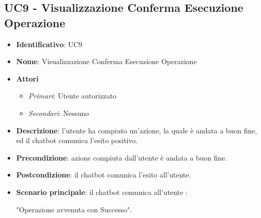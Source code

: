 \subsection{UC9 - Visualizzazione Conferma Esecuzione Operazione}
\begin{itemize}
	\item \textbf{Identificativo}: UC9
	\item \textbf{Nome}: Visualizzazione Conferma Esecuzione Operazione
	\item \textbf{Attori}
	\begin{itemize} 
		\item \textit{Primari}: Utente autorizzato
	    \item \textit{Secondari}: Nessuno
	\end{itemize}
	\item \textbf{Descrizione}: l'utente ha compiuto un'azione, la quale è andata a buon fine, ed il chatbot comunica l'esito positivo.
	\item \textbf{Precondizione}: azione compiuta dall'utente è andata a buon fine.
	\item \textbf{Postcondizione}: il chatbot comunica l'esito all'utente.
	\item \textbf{Scenario principale}: il chatbot comunica all'utente : \begin{center}
		"Operazione avvenuta con Successo".
	\end{center}
\end{itemize}


